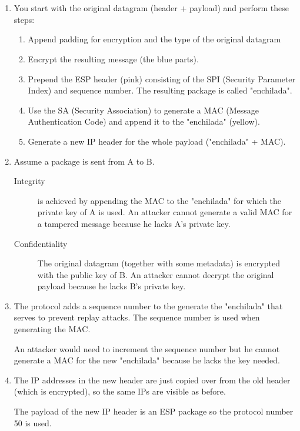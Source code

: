 \documentclass[12pt, a4paper]{article}
\begin{document}
\section{} %
\begin{enumerate}[a]
	\item %
	You start with the original datagram (header + payload) and perform these steps:

	\begin{enumerate}
		\item Append padding for encryption and the type of the original datagram
		\item Encrypt the resulting message (the blue parts).
		\item Prepend the ESP header (pink) consisting of the SPI (Security Parameter Index) and sequence number. The resulting package is called "enchilada".
		\item Use the SA (Security Association) to generate a MAC (Message Authentication Code) and append it to the "enchilada" (yellow).
		\item Generate a new IP header for the whole payload ("enchilada" + MAC).
	\end{enumerate}
	\item %
	Assume a package is sent from A to B.
	\begin{description}
		\item[Integrity] is achieved by appending the MAC to the "enchilada" for which the private key of A is used. An attacker cannot generate a valid MAC for a tampered message because he lacks A's private key.
		\item[Confidentiality] The original datagram (together with some metadata) is encrypted with the public key of B. An attacker cannot decrypt the original payload because he lacks B's private key.
	\end{description}
	\item %
	The protocol adds a sequence number to the generate the "enchilada" that serves to prevent replay attacks. The sequence number is used when generating the MAC.

	An attacker would need to increment the sequence number but he cannot generate a MAC for the new "enchilada" because he lacks the key needed.
	\item %
	The IP addresses in the new header are just copied over from the old header (which is encrypted), so the same IPs are visible as before.

	The payload of the new IP header is an ESP package so the protocol number 50 is used.
\end{enumerate}
\end{document}
